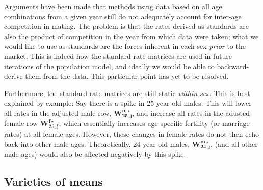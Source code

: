 Arguments have been made that methods using data based on all age combinations from a given year still do not adequately account for inter-age competition in mating. The problem is that the rates derived as standards are also the product of competition in the year from which data were taken; what we would like to use as standards are the forces inherent in each sex \textit{prior} to the market. This is indeed how the standard rate matrices are used in future iterations of the population model, and ideally we would be able to backward-derive them from the data. This particular point has yet to be resolved.

Furthermore, the standard rate matrices are still static \textit{within-sex}. This is best explained by example: Say there is a spike in 25 year-old males. This will lower all rates in the adjusted male row, $\bm{W_{25,j}^{m\star}}$, and increase all rates in the adusted female row $\bm{W_{25,j}^{f\star}}$, which essentially increases age-specific fertility (or marriage rates) at all female ages. However, these changes in female rates do not then echo back into other male ages. Theoretically, 24 year-old males, $\bm{W_{24,j}^{m\star}}$, (and all other male ages) would also be affected negatively by this spike. 

\subsection{Varieties of means}



\citet{keyfitz1972mathematics}

